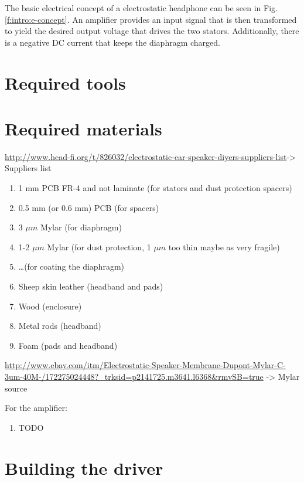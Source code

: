 \documentclass{article}
\begin{document}
The basic electrical concept of a electrostatic headphone can be seen in Fig. \ref{f:intro:e-concept}. An amplifier provides an input signal that is then transformed to yield the desired output voltage that drives the two stators. Additionally, there is a negative DC current that keeps the diaphragm charged.

\section{Required tools}
\label{s:tools}

\section{Required materials}
\label{s:materials}
\url{http://www.head-fi.org/t/826032/electrostatic-ear-speaker-diyers-suppliers-list}-> Suppliers list
\begin{enumerate}
    \item 1 mm PCB FR-4 and not laminate (for stators and dust protection spacers)
    \item 0.5 mm (or 0.6 mm) PCB (for spacers)
    \item 3 $\mu m$ Mylar (for diaphragm)
    \item 1-2 $\mu m$ Mylar (for dust protection, 1 $\mu m$ too thin maybe as very fragile) %
    \item \ldots (for coating the diaphragm) %
    \item Sheep skin leather (headband and pads)
    \item Wood (enclosure)
    \item Metal rods (headband)
    \item Foam (pads and headband)
\end{enumerate}

\url{http://www.ebay.com/itm/Electrostatic-Speaker-Membrane-Dupont-Mylar-C-3um-40M-/172275024448?_trksid=p2141725.m3641.l6368&rmvSB=true} -> Mylar source

For the amplifier:
\begin{enumerate}
    \item TODO
\end{enumerate}

\section{Building the driver}
\label{s:driver}
\end{document}
